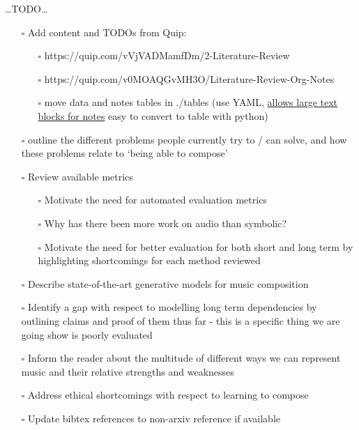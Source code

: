 \documentclass[12pt,a4paper,]{report}
\providecommand{\tightlist}{%
  \setlength{\itemsep}{0pt}\setlength{\parskip}{0pt}}
\begin{document}
\ldots TODO\ldots{}

\begin{itemize}
\tightlist
\item[$\square$]
  Add content and TODOs from Quip:

  \begin{itemize}
  \tightlist
  \item[$\square$]
    https://quip.com/vVjVADMamfDm/2-Literature-Review
  \item[$\square$]
    https://quip.com/v0MOAQGvMH3O/Literature-Review-Org-Notes
  \item[$\square$]
    move data and notes tables in ./tables (use YAML,
    \href{https://stackoverflow.com/a/3790497/2550114}{allows large text
    blocks for notes} easy to convert to table with python)
  \end{itemize}
\item[$\square$]
  outline the different problems people currently try to / can solve,
  and how these problems relate to `being able to compose'
\item[$\square$]
  Review available metrics

  \begin{itemize}
  \tightlist
  \item[$\square$]
    Motivate the need for automated evaluation metrics
  \item[$\square$]
    Why has there been more work on audio than symbolic?
  \item[$\square$]
    Motivate the need for better evaluation for both short and long term
    by highlighting shortcomings for each method reviewed
  \end{itemize}
\item[$\square$]
  Describe state-of-the-art generative models for music composition
\item[$\square$]
  Identify a gap with respect to modelling long term dependencies by
  outlining claims and proof of them thus far - this is a specific thing
  we are going show is poorly evaluated
\item[$\square$]
  Inform the reader about the multitude of different ways we can
  represent music and their relative strengths and weaknesses
\item[$\square$]
  Address ethical shortcomings with respect to learning to compose
\item[$\square$]
  Update bibtex references to non-arxiv reference if available
\end{itemize}
\end{document}
